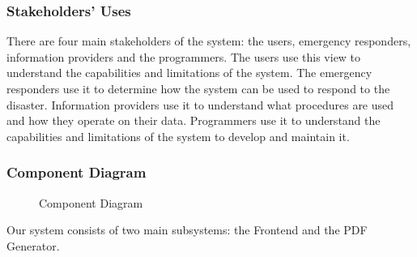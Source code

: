 \documentclass[a4paper]{article}
\begin{document}
    \subsubsection{Stakeholders' Uses}
    There are four main stakeholders of the system: the users, emergency responders, information providers and the programmers.
    The users use this view to understand the capabilities and limitations of the system. The emergency responders use it to
    determine how the system can be used to respond to the disaster. Information providers use it to understand what procedures
    are used and how they operate on their data. Programmers use it to understand the capabilities and limitations of the system
    to develop and maintain it.
    \subsubsection{Component Diagram}
    \begin{figure}
        
        \caption{Component Diagram}
    \end{figure}

    Our system consists of two main subsystems: the Frontend and the PDF Generator.

\end{document}
